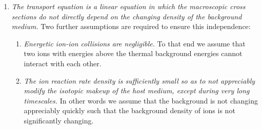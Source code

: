 \begin{enumerate}
  \item \textit{The transport equation is a linear equation in which the macroscopic cross sections
  do not directly depend on the changing density of the background medium.} Two further assumptions are required to ensure this independence:
  \begin{enumerate}
    \item \textit{Energetic ion-ion collisions are negligible.} To that end we assume that two ions with energies above the thermal background energies cannot interact with each other.
    \item \textit{The ion reaction rate density is sufficiently small so as to not appreciably modify the
    isotopic makeup of the host medium, except during very long timescales.} In other words we assume that the background is not changing appreciably quickly such that the background density of ions is not significantly changing.
  \end{enumerate}
\end{enumerate}